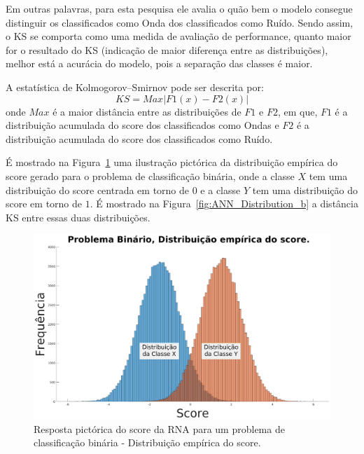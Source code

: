 Em outras palavras, para esta pesquisa ele avalia o quão bem o modelo consegue distinguir os classificados como Onda dos classificados como Ruído. Sendo assim, o KS se comporta como uma medida de avaliação de performance, quanto maior for o resultado do KS (indicação de maior diferença entre as distribuições), melhor está a acurácia do modelo, pois a separação das classes é maior. 

A estatística de Kolmogorov–Smirnov pode ser descrita por: 
\begin{equation}
KS = Max|F1(x)−F2(x)|
\label{eq:kolmogorov}
\end{equation}
onde $Max$ é a maior distância entre as distribuições de $F1$ e $F2$, em que, $F1$ é a distribuição acumulada do score dos classificados como Ondas e $F2$ é a distribuição acumulada do score dos classificados como Ruído.

É mostrado na Figura~\ref{fig:ANN_Distribution_a} uma ilustração pictórica da distribuição empírica do score gerado para o problema de classificação binária, onde a classe $X$ tem uma distribuição do score centrada em torno de $0$ e a classe $Y$ tem uma distribuição do score em torno de $1$. É mostrado na Figura~\ref{fig:ANN_Distribution_b} a distância KS entre essas duas distribuições.

\begin{figure}[H]
\centering
\includegraphics[width=1\textwidth]{figuras/hitograma_distribuicao_empirica_score.eps}
\caption{Resposta pictórica do score da RNA para um problema de classificação binária - Distribuição empírica do score.}
\label{fig:ANN_Distribution_a}
\end{figure}


